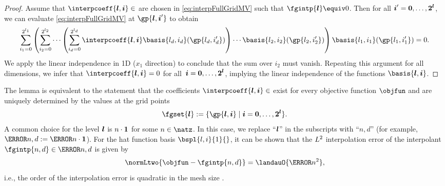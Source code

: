 \begin{proof}
  Assume that $\interpcoeff{\*l,\*i} \in \real$ are chosen in \eqref{eq:interpFullGridMV}
  such that $\fgintp{\*l} \equiv 0$.
  Then for all ${\boldsymbol{i}}' = {\boldsymbol{0}}, \dotsc, {\boldsymbol{2}}^{{\boldsymbol{l}}}$,
  we can evaluate \eqref{eq:interpFullGridMV} at $\gp{\*l,\*i'}$ to obtain
  \begin{equation}
    \sum_{i_1=0}^{2^{l_1}}
    \left(\sum_{i_2=0}^{2^{l_2}} \dotsb
    \left(\sum_{i_d=0}^{2^{l_d}} \interpcoeff{\*l,\*i} \basis{l_d,i_d}(\gp{l_d,i_d'})\right) \dotsb
    \basis{l_2,i_2}(\gp{l_2,i_2'})\right) \basis{l_1,i_1}(\gp{l_1,i_1'})
    = 0.
  \end{equation}
  We apply the linear independence in 1D ($x_1$ direction) to conclude that
  the sum over $i_2$ must vanish.
  Repeating this argument for all dimensions, we infer that $\interpcoeff{\*l,\*i} = 0$
  for all~${\boldsymbol{i}} = {\boldsymbol{0}}, \dotsc, {\boldsymbol{2}}^{{\boldsymbol{l}}}$,
  implying the linear independence of the functions $\basis{\*l,\*i}$.
\end{proof}
The lemma is equivalent to the statement that the coefficients $\interpcoeff{\*l,\*i} \in \real$
exist for every objective function $\objfun$ and are uniquely determined by
the values at the grid points
\begin{equation}
  \fgset{\*l}
  := \{\gp{\*l,\*i} \mid \*i = \*0, \dotsc, \*2^{\*l}\}.
\end{equation}
A common choice for the level ${\boldsymbol{l}}$ is $n \cdot {\boldsymbol{1}}$ for some $n \in \natz$.
In this case, we replace ``${\boldsymbol{l}}$'' in the subscripts with ``$n{,}d$''
(for example, $\ns{n,d} := \ns{n \cdot \*1}$).
For the hat function basis $\bspl{l,i}{1}{}$,
it can be shown that the $L^2$ interpolation error of the interpolant
$\fgintp{n,d} \in \ns{n,d}$ is given by
\begin{equation}
  \normLtwo{\objfun - \fgintp{n,d}} = \landauO{\ms{n}^2},
\end{equation}
i.e., the order of the interpolation error is quadratic in the mesh size
.
